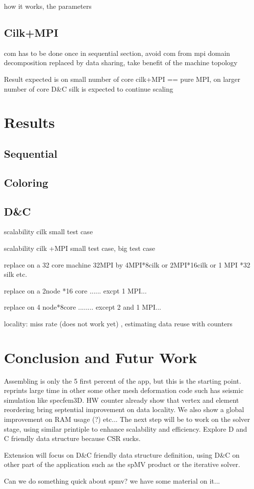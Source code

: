 \documentclass{IOS-Book-Article}
\begin{document}
how it works, the parameters


\subsection{Cilk+MPI}

com has to be done once in sequential section, avoid com from mpi domain decomposition replaced by data sharing, take benefit of the machine topology


Result expected is on small number of core cilk+MPI == pure MPI, on larger number of core D\&C silk is expected to continue scaling

\section{Results}

\subsection{Sequential}
\subsection{Coloring}
\subsection{D\&C}

scalability cilk small test case

scalability cilk +MPI small test case, big test case


replace on a 32 core machine 32MPI by 4MPI*8cilk or 2MPI*16cilk or 1 MPI *32 silk etc.

replace on a 2node *16 core   ...... excpt 1 MPI...

replace on 4 node*8core ........ except 2 and 1 MPI...


locality: miss rate (does not work yet) , estimating data reuse with counters

\section{Conclusion and Futur Work}

Assembling is only the 5 first percent of the app, but this is the starting point. reprints large time in other some other mesh deformation code such has seismic simulation like specfem3D.
HW counter already show that vertex and element reordering bring septential improvement on data locality. We also show a global improvement on RAM usage (?) etc... The next step will be to work
on the solver stage, using similar printiple to enhance scalability and efficiency. Explore D and C friendly data structure because CSR sucks.  

 Extension will focus on D\&C friendly data structure definition, using D\&C on other part of the  application such as the spMV product or the iterative solver. 

Can we do something quick about spmv? we have some material on it...



\end{document}
